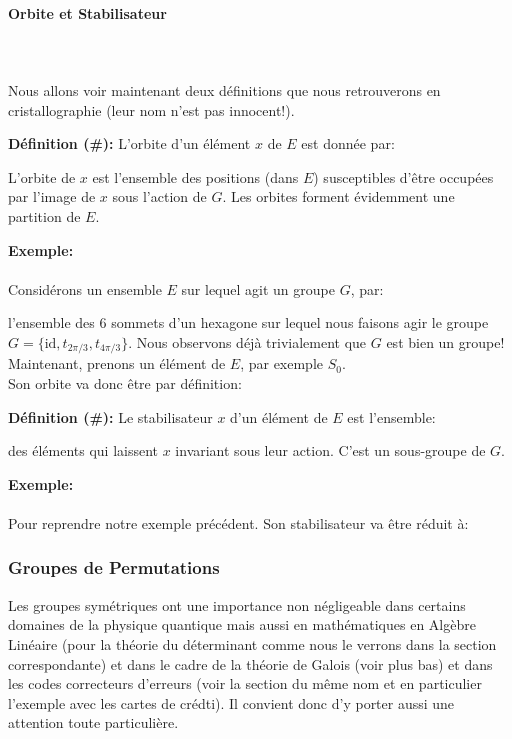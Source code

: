 	\pagebreak
	\paragraph{Orbite et Stabilisateur}\mbox{}\\\\
	Nous allons voir maintenant deux définitions que nous retrouverons en cristallographie (leur nom n'est pas innocent!).
	
	\textbf{Définition (\#\mydef):} L'orbite d'un élément $x$ de $E$ est donnée par:
	
	L'orbite de $x$ est l'ensemble des positions (dans $E$) susceptibles d'être occupées par l'image de $x$ sous l'action de $G$. Les orbites forment évidemment une partition de $E$. 
	
	\begin{tcolorbox}[colframe=black,colback=white,sharp corners]
	\textbf{{\Large {}}Exemple:}\\\\
	Considérons un ensemble $E$ sur lequel agit un groupe $G$, par:
	
	l'ensemble des $6$  sommets d'un hexagone sur lequel nous faisons agir le groupe $G=\{\text{id},t_{2\pi/3},t_{4\pi/3}\}$. Nous observons déjà trivialement que $G$ est bien un groupe!\\
	
	Maintenant, prenons un élément de $E$, par exemple $S_0$.\\
	
	Son orbite va donc être par définition:
	
	\end{tcolorbox}
	\textbf{Définition (\#\mydef):} Le stabilisateur $x$ d'un élément de $E$ est l'ensemble:
	
	des éléments qui laissent $x$ invariant sous leur action. C'est un sous-groupe de $G$.
	\begin{tcolorbox}[colframe=black,colback=white,sharp corners]
	\textbf{{\Large {}}Exemple:}\\\\
	Pour reprendre notre exemple précédent. Son stabilisateur va être réduit à:
	
	\end{tcolorbox}
	
	
	\pagebreak
	\subsubsection{Groupes de Permutations}
	Les groupes symétriques ont une importance non négligeable dans certains domaines de la physique quantique mais aussi en mathématiques en Algèbre Linéaire (pour la théorie du déterminant comme nous le verrons dans la section correspondante) et dans le cadre de la théorie de Galois (voir plus bas) et dans les codes correcteurs d'erreurs (voir la section du même nom et en particulier l'exemple avec les cartes de crédti). Il convient donc d'y porter aussi une attention toute particulière.
	
